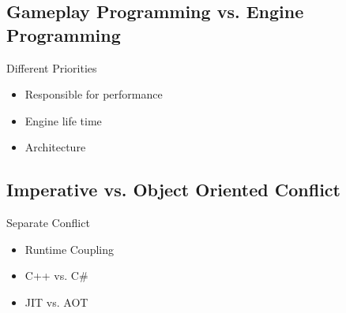 \subsection{Gameplay Programming vs. Engine Programming}
\begin{frame}{\secname}{\subsecname}
	Different Priorities
	\begin{itemize}
		\item Responsible for performance
		\item Engine life time
		\item Architecture
	\end{itemize}
\end{frame}

\subsection{Imperative vs. Object Oriented Conflict}
\begin{frame}{\secname}{\subsecname}
	Separate Conflict
	\begin{itemize}
		\item Runtime Coupling
		\item C++ vs. C#
		\item JIT vs. AOT
	\end{itemize}
\end{frame}
